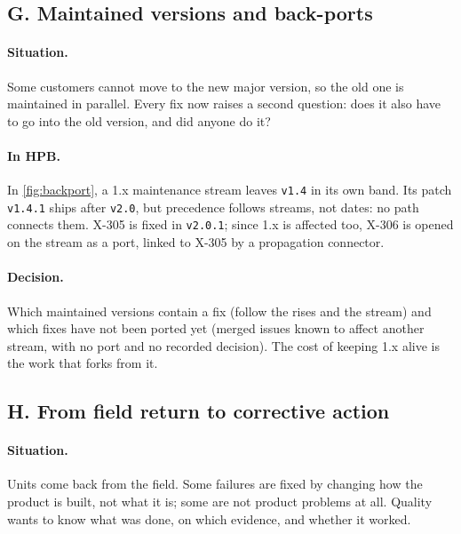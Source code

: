 \subsection{G. Maintained versions and back-ports}
\label{sec:cond-backport}



\paragraph{Situation.}
Some customers cannot move to the new major version, so the old one is
maintained in parallel. Every fix now raises a second question: does it
also have to go into the old version, and did anyone do it?

\paragraph{In HPB.}
In \cref{fig:backport}, a 1.x maintenance stream leaves \texttt{v1.4} in
its own band. Its patch \texttt{v1.4.1} ships after \texttt{v2.0}, but
precedence follows streams, not dates: no path connects them. X-305 is
fixed in \texttt{v2.0.1}; since 1.x is affected too, X-306 is opened on
the stream as a port, linked to X-305 by a propagation connector.

\paragraph{Decision.}
Which maintained versions contain a fix (follow the rises and the stream)
and which fixes have not been ported yet (merged issues known to affect
another stream, with no port and no recorded decision). The cost of
keeping 1.x alive is the work that forks from it.

\subsection{H. From field return to corrective action}
\label{sec:cond-rma}



\paragraph{Situation.}
Units come back from the field. Some failures are fixed by changing how
the product is built, not what it is; some are not product problems at
all. Quality wants to know what was done, on which evidence, and whether
it worked.

